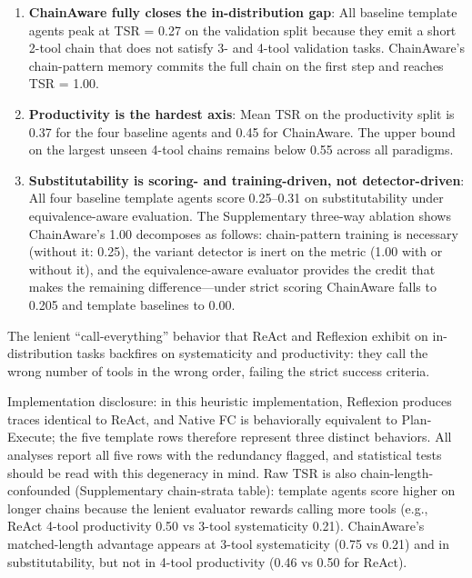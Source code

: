 ﻿\documentclass{article}
\begin{document}
\begin{enumerate}
    \item \textbf{ChainAware fully closes the in-distribution gap}: All baseline template agents peak at TSR = 0.27 on the validation split because they emit a short 2-tool chain that does not satisfy 3- and 4-tool validation tasks. ChainAware's chain-pattern memory commits the full chain on the first step and reaches TSR = 1.00.
    \item \textbf{Productivity is the hardest axis}: Mean TSR on the productivity split is 0.37 for the four baseline agents and 0.45 for ChainAware. The upper bound on the largest unseen 4-tool chains remains below 0.55 across all paradigms.
    \item \textbf{Substitutability is scoring- and training-driven, not detector-driven}: All four baseline template agents score 0.25--0.31 on substitutability under equivalence-aware evaluation. The Supplementary three-way ablation shows ChainAware's 1.00 decomposes as follows: chain-pattern training is necessary (without it: 0.25), the variant detector is inert on the metric (1.00 with or without it), and the equivalence-aware evaluator provides the credit that makes the remaining difference---under strict scoring ChainAware falls to 0.205 and template baselines to 0.00.
\end{enumerate}

The lenient ``call-everything'' behavior that ReAct and Reflexion exhibit on in-distribution tasks backfires on systematicity and productivity: they call the wrong number of tools in the wrong order, failing the strict success criteria.

Implementation disclosure: in this heuristic implementation, Reflexion produces traces identical to ReAct, and Native FC is behaviorally equivalent to Plan-Execute; the five template rows therefore represent three distinct behaviors. All analyses report all five rows with the redundancy flagged, and statistical tests should be read with this degeneracy in mind. Raw TSR is also chain-length-confounded (Supplementary chain-strata table): template agents score higher on longer chains because the lenient evaluator rewards calling more tools (e.g., ReAct 4-tool productivity 0.50 vs 3-tool systematicity 0.21). ChainAware's matched-length advantage appears at 3-tool systematicity (0.75 vs 0.21) and in substitutability, but not in 4-tool productivity (0.46 vs 0.50 for ReAct).
\end{document}
